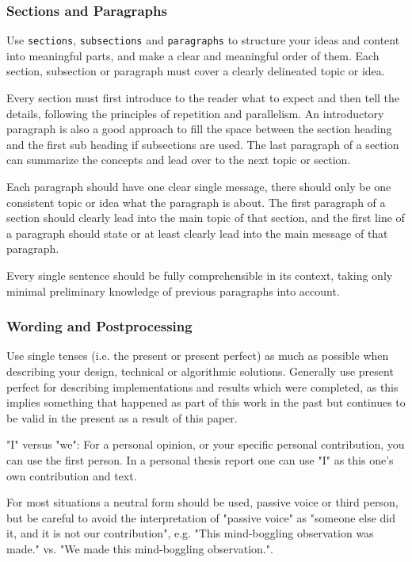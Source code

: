 \documentclass[11pt, a4paper,oneside,chapterprefix=false]{scrbook}
\begin{document}
\subsubsection*{Sections and Paragraphs}

Use \texttt{sections}, \texttt{subsections} and \texttt{paragraphs} to structure your ideas and content into meaningful parts, and make a clear and meaningful order of them. Each section, subsection or paragraph must cover a clearly delineated topic or idea.

Every section must first introduce to the reader what to expect and then tell the details, following the principles of repetition and parallelism. An introductory paragraph is also a good approach to fill the space between the section heading and the first sub heading if subsections are used. The last paragraph of a section can summarize the concepts and lead over to the next topic or section.

Each paragraph should have one clear single message, there should only be one consistent topic or idea what the paragraph is about. The first paragraph of a section should clearly lead into the main topic of that section, and the first line of a paragraph should state or at least clearly lead into the main message of that paragraph.

Every single sentence should be fully comprehensible in its context, taking only minimal preliminary knowledge of previous paragraphs into account.

\subsubsection*{Wording and Postprocessing}

Use single tenses (i.e. the present or present perfect) as much as possible when describing your design, technical or algorithmic solutions. Generally use present perfect for describing implementations and results which were completed, as this implies something that happened as part of this work in the past but continues to be valid in the present as a result of this paper.

"I" versus "we": For a personal opinion, or your specific personal contribution, you can use the first person. In a personal thesis report one can use "I" as this one's own contribution and text.

For most situations a neutral form should be used, passive voice or third person, but be careful to avoid the interpretation of "passive voice" as "someone else did it, and it is not our contribution", e.g. "This mind-boggling observation was made." vs. "We made this mind-boggling observation.".
\end{document}
